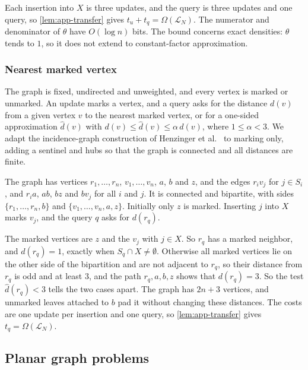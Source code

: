 Each insertion into $X$ is three updates, and the query is three updates and one query, so \cref{lem:app-transfer} gives $t_u+t_q=\Omega(\mathcal L_N)$. The numerator and denominator of $\theta$ have $O(\log n)$ bits. The bound concerns exact densities: $\theta$ tends to $1$, so it does not extend to constant-factor approximation.

\subsubsection{Nearest marked vertex}\label{sec:app-marked-distance}

The graph is fixed, undirected and unweighted, and every vertex is marked or unmarked. An update marks a vertex, and a query asks for the distance $d(v)$ from a given vertex $v$ to the nearest marked vertex, or for a one-sided approximation $\widehat d(v)$ with $d(v)\le\widehat d(v)\le\alpha\,d(v)$, where $1\le\alpha<3$. We adapt the incidence-graph construction of Henzinger et al.~\cite[Lemma~3.7]{henzinger_unifying_2015} to marking only, adding a sentinel and hubs so that the graph is connected and all distances are finite.

The graph has vertices $r_1,\dots,r_n$, $v_1,\dots,v_n$, $a$, $b$ and $z$, and the edges $r_iv_j$ for $j\in S_i$, and $r_ia$, $ab$, $bz$ and $bv_j$ for all $i$ and $j$. It is connected and bipartite, with sides $\{r_1,\dots,r_n,b\}$ and $\{v_1,\dots,v_n,a,z\}$. Initially only $z$ is marked. Inserting $j$ into $X$ marks $v_j$, and the query $q$ asks for $d(r_q)$.

The marked vertices are $z$ and the $v_j$ with $j\in X$. So $r_q$ has a marked neighbor, and $d(r_q)=1$, exactly when $S_q\cap X\ne\emptyset$. Otherwise all marked vertices lie on the other side of the bipartition and are not adjacent to $r_q$, so their distance from $r_q$ is odd and at least $3$, and the path $r_q,a,b,z$ shows that $d(r_q)=3$. So the test $\widehat d(r_q)<3$ tells the two cases apart. The graph has $2n+3$ vertices, and unmarked leaves attached to $b$ pad it without changing these distances. The costs are one update per insertion and one query, so \cref{lem:app-transfer} gives $t_q=\Omega(\mathcal L_N)$.

\subsection{Planar graph problems}\label{sec:planar}

